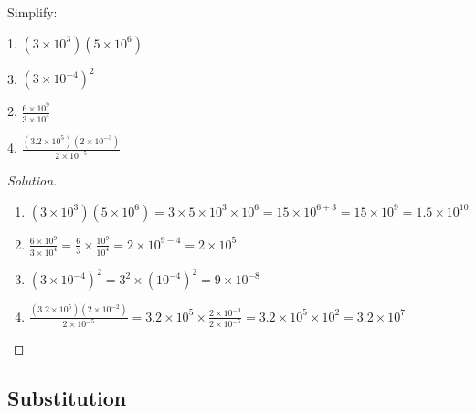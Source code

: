 \documentclass[../main.tex]{subfiles}
\begin{document}
%
\begin{problem}
Simplify:
\begin{enumerate}
    \begin{multicols}{2}
    \item[1.] $(3\times 10^3)(5\times 10^6)$
    \item[3.] $(3\times 10^{-4})^{2}$
    \item[2.] $\frac{6\times 10^9}{3\times 10^4}$
    \item[4.] $\frac{(3.2\times 10^{5})(2\times 10^{-3})}{2\times 10^{-5}}$
    \end{multicols}
\end{enumerate}
\end{problem}
\begin{proof}[Solution]
\
\begin{enumerate}
    \item $(3\times 10^3)(5\times 10^6) = 3\times 5 \times 10^3 \times 10^6 = 15 \times 10^{6+3} = 15\times 10^9 = \boxed{1.5\times 10^{10}}$
    \item $\frac{6\times 10^9}{3\times 10^4} =  \frac{6}{3}\times \frac{10^9}{10^4} = 2\times 10^{9-4} = \boxed{2\times 10^5}$
    \item $(3\times 10^{-4})^2 = 3^2 \times (10^{-4})^2 = \boxed{9\times 10^{-8}}$
    \item $\frac{(3.2\times 10^{5})(2\times 10^{-2})}{2\times 10^{-5}} = 3.2\times 10^{5} \times \frac{2\times 10^{-3}}{2\times 10^{-5}} = 3.2 \times 10^{5}\times 10^{2} = \boxed{3.2\times 10^{7}}$
\end{enumerate}
\end{proof}
%
\subsection{Substitution}
%
\end{document}
